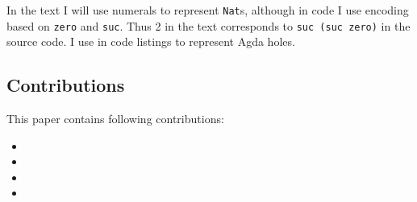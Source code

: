 In the text I will use numerals to represent \texttt{Nat}s, although in code I use encoding based on \texttt{zero} and \texttt{suc}. Thus 2 in the text corresponds to \texttt{suc (suc zero)} in the source code. I use \texttt{} in code listings to represent Agda holes.

\subsection{Contributions}

This paper contains following contributions:

\begin{itemize}
 \item %
 \item %
 \item %
 \item %
\end{itemize}
